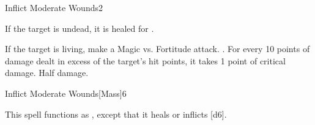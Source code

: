 \begin{spellsection}{Inflict Moderate Wounds}{2}
\begin{spellheader}
    \spellrng{\rngclose}
\end{spellheader}
\begin{spellcontent}
    \begin{spelltargetinginfo}
    \end{spelltargetinginfo}
    \begin{spelleffects}
        \spelleffect If the target is undead, it is healed for .
        \begin{spellattacktriggered}{If the target is living, make a Magic vs. Fortitude attack.}
            \spellsuccess {}. For every 10 points of damage dealt in excess of the target's hit points, it takes 1 point of critical damage.
            \spellfailure Half damage.
        \end{spellattacktriggered}
    \end{spelleffects}
\end{spellcontent}
\begin{spellfooter}
\end{spellfooter}
\end{spellsection}

\begin{spellsection}{Inflict Moderate Wounds}[Mass]{6}
\begin{spellheader}
\end{spellheader}
\begin{spellcontent}
    \begin{spelltargetinginfo}
    \end{spelltargetinginfo}
    \begin{spelleffects}
        \spellspecial This spell functions as , except that it heals or inflicts [d6].
    \end{spelleffects}
\end{spellcontent}
\begin{spellfooter}
\end{spellfooter}
\end{spellsection}

